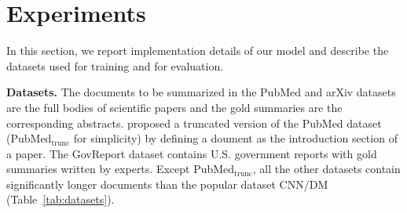 \documentclass[11pt]{article}
\begin{document}
\section{Experiments}
\label{sec:experiments}
In this section, we report implementation details of our model and describe the datasets used for training and for evaluation.

\noindent \textbf{Datasets.}
The documents to be summarized in the PubMed and arXiv datasets \cite{cohan2018discourse} are the full bodies of scientific papers and the gold summaries are the corresponding abstracts. \citet{zhong2020extractive} proposed a truncated version of the PubMed dataset (PubMed$_\text{trunc}$ for simplicity) by defining a doument as the introduction section of a paper. The GovReport dataset \cite{huang2021efficient} contains U.S. government reports with gold summaries written by experts.
Except PubMed$_\text{trunc}$, all the other datasets contain significantly longer documents than the popular dataset CNN/DM (Table~\ref{tab:datasets}).
\end{document}
